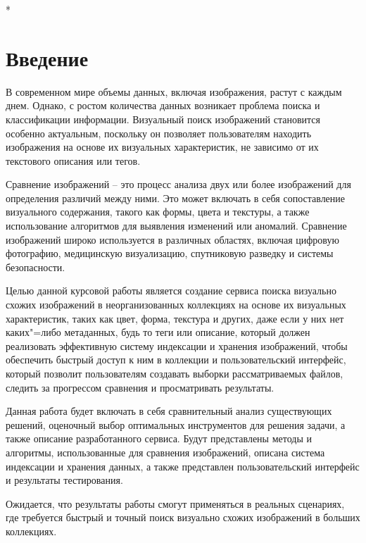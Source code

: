 \documentclass[variant=courcework]{bsuir}
\begin{document}
\maketitle

*

\tableofcontents

\chapter*{Введение}

В современном мире объемы данных, включая изображения, растут с каждым днем.
Однако, с ростом количества данных возникает проблема поиска и классификации
информации. Визуальный поиск изображений становится особенно актуальным,
поскольку он позволяет пользователям находить изображения на основе их
визуальных характеристик, не зависимо от их текстового описания или тегов.

Сравнение изображений -- это процесс анализа двух или более изображений для
определения различий между ними. Это может включать в себя сопоставление
визуального содержания, такого как формы, цвета и текстуры, а также
использование алгоритмов для выявления изменений или аномалий. Сравнение
изображений широко используется в различных областях, включая цифровую
фотографию, медицинскую визуализацию, спутниковую разведку и системы
безопасности.

Целью данной курсовой работы является создание сервиса поиска визуально схожих
изображений в неорганизованных коллекциях на основе их визуальных характеристик,
таких как цвет, форма, текстура и других, даже если у них нет каких"=либо
метаданных, будь то теги или описание, который должен реализовать эффективную
систему индексации и хранения изображений, чтобы обеспечить быстрый доступ к ним
в коллекции и пользовательский интерфейс, который позволит пользователям
создавать выборки рассматриваемых файлов, следить за прогрессом сравнения и
просматривать результаты.

Данная работа будет включать в себя сравнительный анализ существующих решений,
оценочный выбор оптимальных инструментов для решения задачи, а также описание
разработанного сервиса. Будут представлены методы и алгоритмы, использованные
для сравнения изображений, описана система индексации и хранения данных, а также
представлен пользовательский интерфейс и результаты тестирования.

Ожидается, что результаты работы смогут применяться в реальных сценариях, где
требуется быстрый и точный поиск визуально схожих изображений в больших
коллекциях.
\end{document}
